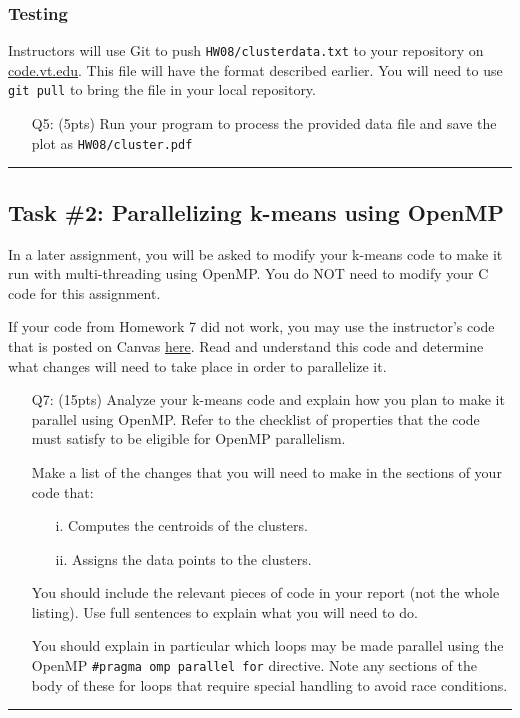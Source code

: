 \subsubsection*{Testing}

Instructors will use Git to push \texttt{HW08/clusterdata.txt} to your repository on \href{http://code.vt.edu}{code.vt.edu}.
This file will have the format described earlier.
You will need to use \texttt{git pull} to bring the file in your local repository.

\begin{itemize}
    \item[Q5:] (5pts) Run your program to process the provided data file and save the plot as \texttt{HW08/cluster.pdf}
\end{itemize}

\vspace{8pt}\hrule

\newpage

\subsection*{Task \#2: Parallelizing k-means using OpenMP}

In a later assignment, you will be asked to modify your k-means code to make it run with multi-threading using OpenMP.
You do NOT need to modify your C code for this assignment.
\begin{tcolorbox}[width=\textwidth,colback=green]
If your code from Homework 7 did not work, you may use the instructor's code that is posted on Canvas \href{https://canvas.vt.edu/courses/95914/files/folder/Homework/HW07\%20example}{here}.
Read and understand this code and determine what changes will need to take place in order to parallelize it.
\end{tcolorbox}

\begin{itemize}
    \item[Q7:] (15pts) Analyze your k-means code and  explain how you plan to make it parallel using OpenMP. Refer to the checklist of properties that the code must satisfy to be eligible for OpenMP parallelism.
    
    Make a list of the changes that you will need to make in the sections of your code that:
    \begin{enumerate}
        \item [i.] Computes the centroids of the clusters.
        \item[ii.] Assigns the data points to the clusters.
    \end{enumerate}
    You should include the relevant pieces of code in your report (not the whole listing). Use full sentences to explain what you will need to do.
    
    You should explain in particular which loops may be made parallel using the OpenMP \texttt{\#pragma omp parallel for} directive. Note any sections of the body of these for loops that require special handling to avoid race conditions.
\end{itemize}
\vspace{8pt} \hrule
\newpage
